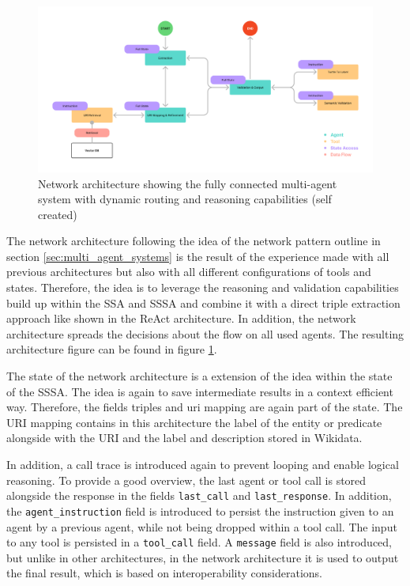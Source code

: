 \documentclass[a4paper,oneside,bibliography=totoc]{scrbook}
\begin{document}
\begin{figure}[h]
  \centering
  \includegraphics[width=\textwidth]{figures/Network Architecture.png}
  \caption{Network architecture showing the fully connected multi-agent system with dynamic routing and reasoning capabilities (self created)}
  \label{fig:network_architecture}
\end{figure}

The network architecture following the idea of the network pattern outline in section \ref{sec:multi_agent_systems} is the result of the experience made with all previous architectures but also with all different configurations of tools and states. Therefore, the idea is to leverage the reasoning and validation capabilities build up within the \ac{SSA} and \ac{SSSA} and combine it with a direct triple extraction approach like shown in the ReAct architecture. In addition, the network architecture spreads the decisions about the flow on all used agents. The resulting architecture figure can be found in figure \ref{fig:network_architecture}.

The state of the network architecture is a extension of the idea within the state of the \ac{SSSA}. The idea is again to save intermediate results in a context efficient way. Therefore, the fields triples and uri mapping are again part of the state. The URI mapping contains in this architecture the label of the entity or predicate alongside with the URI and the label and description stored in Wikidata.

In addition, a call trace is introduced again to prevent looping and enable logical reasoning. To provide a good overview, the last agent or tool call is stored alongside the response in the fields \texttt{last\_call} and \texttt{last\_response}. In addition, the \texttt{agent\_instruction} field is introduced to persist the instruction given to an agent by a previous agent, while not being dropped within a tool call. The input to any tool is persisted in a \texttt{tool\_call} field. A \texttt{message} field is also introduced, but unlike in other architectures, in the network architecture it is used to output the final result, which is based on interoperability considerations.
\end{document}
